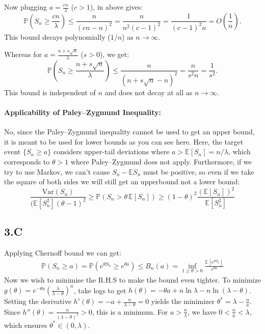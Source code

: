 \documentclass{article}
\begin{document}
Now plugging $a = \frac{cn}{\lambda}$ ($c > 1$), in above gives: 
\[
\mathbb{P} \left(S_n \ge \frac{cn}{\lambda}\right) \le \frac{n}{(c n - n)^2} = \frac{n}{n^2(c-1)^2} = \frac{1}{(c-1)^2 n} = O\left(\frac{1}{n}\right).
\]
This bound decays polynomially ($1/n$) as $n \to \infty$.

Whereas for $a = \frac{n + s\sqrt{n}}{\lambda}$ ($s > 0$), we get:
\[
\mathbb{P}\left(S_n \ge \frac{n + s\sqrt{n}}{\lambda}\right) \le \frac{n}{\left(n + s\sqrt{n} - n\right)^2} = \frac{n}{s^2 n} = \frac{1}{s^2}.
\]
This bound is independent of $n$ and does not decay at all as $n \to \infty$.

\paragraph{Applicability of Paley--Zygmund Inequality:}
No, since the Paley--Zygmund inequality cannot be used to get an upper bound, it is meant to be used for lower bounds as you can see here. Here, the target event $\{S_n \ge a\}$ considers upper-tail deviations where $a > \mathbb{E}[S_n] = n/\lambda$, which corresponds to $\theta > 1$ where Paley--Zygmund does not apply. Furthermore, if we try to use Markov, we can't cause $S_n - \mathbb{E} S_n $ must be positive, so even if we take the square of both sides we will still get an upperbound not a lower bound:
\[
\frac{\text{Var}(S_n)}{(\mathbb{E}[S_n^2] (\theta -1 )^2}\ge \mathbb{P}(S_n > \theta \, \mathbb{E}[S_n]) \ge (1 - \theta)^2 \frac{(\mathbb{E}[S_n])^2}{\mathbb{E}[S_n^2]}
\]
\subsection*{3.C}
Applying Chernoff bound we can get:
\begin{align*}
\mathbb{P}(S_n \ge a) = \mathbb{P}(e^{\theta S_n} \ge e^{\theta a}) \le B_n(a)=\inf_{1\ge \theta >0} \frac{\mathbb{E}[e^{\theta S_n}]}{e^{\theta a}}
\end{align*}
Now we wish to minimise the R.H.S to make the bound even tighter. To minimize $g(\theta) = e^{-\theta a} (\frac{\lambda}{\lambda - \theta})^n$, take logs to get $h(\theta) = -\theta a + n\ln\lambda - n\ln(\lambda - \theta)$. Setting the derivative $h'(\theta) = -a + \frac{n}{\lambda - \theta} = 0$ yields the minimizer $\theta^* = \lambda - \frac{n}{a}$. Since $h''(\theta) = \frac{n}{(\lambda - \theta)^2} > 0$, this is a minimum. For $a > \frac{n}{\lambda}$, we have $0 < \frac{n}{a} < \lambda$, which ensures $\theta^* \in (0, \lambda)$.
\end{document}
